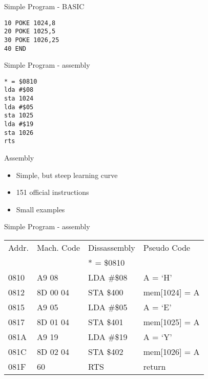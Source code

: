 \documentclass[aspectratio=43]{uva-inf-presentation}
\begin{document}

\begin{frame}[fragile]{Simple Program - BASIC}

\begin{lstlisting}
10 POKE 1024,8
20 POKE 1025,5
30 POKE 1026,25
40 END
\end{lstlisting}

\end{frame}


\begin{frame}[fragile]{Simple Program - assembly}

\begin{lstlisting}
* = $0810
lda #$08
sta 1024
lda #$05
sta 1025
lda #$19
sta 1026
rts
\end{lstlisting}

\end{frame}


\begin{frame}{Assembly}

\begin{itemize}
\item Simple, but steep learning curve
\item 151 official instructions
\item Small examples
\end{itemize}

\end{frame}


\begin{frame}{Simple Program - assembly}

\begin{tabular}{l|l|l|l}
Addr. & Mach. Code & Dissassembly & Pseudo Code \\
 & & * = \$0810 & \\
0810 & A9 08 & LDA \#\$08 & A = `H' \\
0812 & 8D 00 04 & STA \$400 & mem[1024] = A \\
0815 & A9 05 & LDA \#\$05 & A = `E' \\
0817 & 8D 01 04 & STA \$401 & mem[1025] = A \\
081A & A9 19 & LDA \#\$19 & A = `Y' \\
081C & 8D 02 04 & STA \$402 & mem[1026] = A \\
081F & 60 & RTS & return \\
\end{tabular}

\end{frame}
\end{document}
